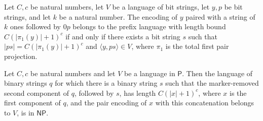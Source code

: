 \begin{theorem}
\label{Complexity.KarpLipton.mem_prefixLang_iff}
\leanok
{}
Let $C,c$ be natural numbers, let $V$ be a language of bit strings, let $y,p$ be bit
strings, and let $k$ be a natural number. The encoding of $y$ paired with a string of
$k$ ones followed by $0p$ belongs to the prefix language with length bound
$C(\lvert\pi_1(y)\rvert+1)^c$ if and only if there exists a bit string $s$ such that
$\lvert ps\rvert=C(\lvert\pi_1(y)\rvert+1)^c$ and $\langle y,ps\rangle\in V$, where
$\pi_1$ is the total first pair projection.
\end{theorem}

\begin{theorem}
\label{Complexity.KarpLipton.prefixLang_mem_NP}
\leanok
{}
Let $C,c$ be natural numbers and let $V$ be a language in $\mathsf{P}$. Then the
language of binary strings $q$ for which there is a binary string $s$ such that the
marker-removed second component of $q$, followed by $s$, has length $C(|x|+1)^c$, where
$x$ is the first component of $q$, and the pair encoding of $x$ with this concatenation
belongs to $V$, is in $\mathsf{NP}$.
\end{theorem}
